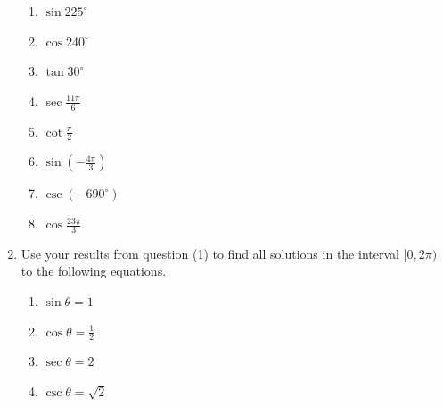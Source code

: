 \documentclass[12pt]{article}
\newif\ifans
\begin{document}
\begin{enumerate}
\begin{enumerate}
\item $\sin{225^\circ}$

\ifans\fbox{$-\frac{1}{\sqrt{2}}$}\fi

\item $\cos{240^\circ}$

\ifans\fbox{$-\frac{1}{2}$}\fi

\item $\tan{30^\circ}$

\ifans\fbox{$\frac{1}{\sqrt{3}}$}\fi

\item $\sec{\frac{11\pi}{6}}$

\ifans\fbox{$\frac{2}{\sqrt{3}}$}\fi

\item $\cot{\frac{\pi}{2}}$

\ifans\fbox{$0$}\fi

\item $\sin{\left(-\frac{4\pi}{3}\right)}$

\ifans\fbox{$\frac{\sqrt{3}}{2}$}\fi

\item $\csc{(-690^\circ)}$

\ifans\fbox{$2$}\fi

\item $\cos{\frac{23\pi}{3}}$

\ifans\fbox{$\frac{1}{2}$}\fi

\end{enumerate}

\item Use your results from question (1) to find all solutions in the interval $[0,2\pi)$ to the following equations.

\begin{enumerate}

\item $\sin{\theta}=1$

\ifans\fbox{$\theta=\frac{\pi}{2}$}\fi

\item $\cos{\theta}=\frac{1}{2}$

\ifans\fbox{$\theta=\frac{\pi}{3}$ or $\theta=\frac{5\pi}{3}$}\fi

\item $\sec{\theta}=2$

\ifans\fbox{$\theta=\frac{\pi}{3}$ or $\theta=\frac{5\pi}{3}$}\fi

\item $\csc{\theta}=\sqrt{2}$

\ifans\fbox{$\theta=\frac{\pi}{4}$ or $\theta=\frac{3\pi}{4}$}\fi


\end{enumerate}
\end{enumerate}
\end{document}
